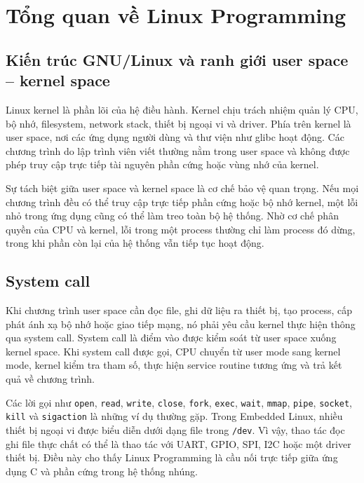 \documentclass[11pt]{article}
\newcommand{\code}[1]{\texttt{#1}}
\begin{document}
\section{Tổng quan về Linux Programming}

\subsection{Kiến trúc GNU/Linux và ranh giới user space -- kernel space}

Linux kernel là phần lõi của hệ điều hành. Kernel chịu trách nhiệm quản lý CPU, bộ nhớ, filesystem, network stack, thiết bị ngoại vi và driver. Phía trên kernel là user space, nơi các ứng dụng người dùng và thư viện như glibc hoạt động. Các chương trình do lập trình viên viết thường nằm trong user space và không được phép truy cập trực tiếp tài nguyên phần cứng hoặc vùng nhớ của kernel.

Sự tách biệt giữa user space và kernel space là cơ chế bảo vệ quan trọng. Nếu mọi chương trình đều có thể truy cập trực tiếp phần cứng hoặc bộ nhớ kernel, một lỗi nhỏ trong ứng dụng cũng có thể làm treo toàn bộ hệ thống. Nhờ cơ chế phân quyền của CPU và kernel, lỗi trong một process thường chỉ làm process đó dừng, trong khi phần còn lại của hệ thống vẫn tiếp tục hoạt động.

\subsection{System call}

Khi chương trình user space cần đọc file, ghi dữ liệu ra thiết bị, tạo process, cấp phát ánh xạ bộ nhớ hoặc giao tiếp mạng, nó phải yêu cầu kernel thực hiện thông qua system call. System call là điểm vào được kiểm soát từ user space xuống kernel space. Khi system call được gọi, CPU chuyển từ user mode sang kernel mode, kernel kiểm tra tham số, thực hiện service routine tương ứng và trả kết quả về chương trình.

Các lời gọi như \code{open}, \code{read}, \code{write}, \code{close}, \code{fork}, \code{exec}, \code{wait}, \code{mmap}, \code{pipe}, \code{socket}, \code{kill} và \code{sigaction} là những ví dụ thường gặp. Trong Embedded Linux, nhiều thiết bị ngoại vi được biểu diễn dưới dạng file trong \code{/dev}. Vì vậy, thao tác đọc ghi file thực chất có thể là thao tác với UART, GPIO, SPI, I2C hoặc một driver thiết bị. Điều này cho thấy Linux Programming là cầu nối trực tiếp giữa ứng dụng C và phần cứng trong hệ thống nhúng.
\end{document}
